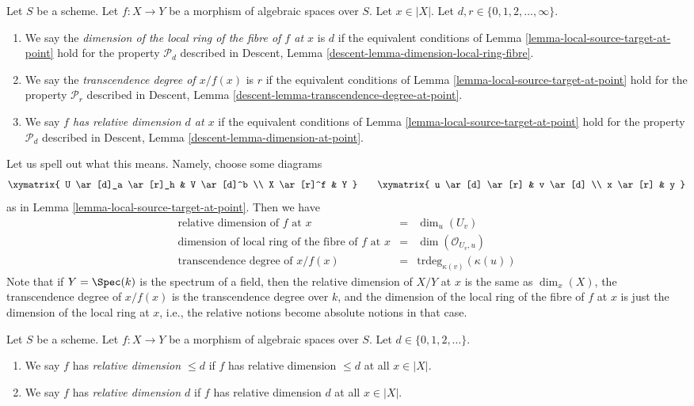 \begin{definition}
\label{definition-dimension-fibre}
Let $S$ be a scheme.
Let $f : X \to Y$ be a morphism of algebraic spaces over $S$.
Let $x \in |X|$.
Let $d, r \in \{0, 1, 2, \ldots, \infty\}$.
\begin{enumerate}
\item We say the
{\it dimension of the local ring of the fibre of $f$ at $x$} is $d$
if the equivalent conditions of
Lemma \ref{lemma-local-source-target-at-point}
hold for the property
$\mathcal{P}_d$ described in
Descent, Lemma \ref{descent-lemma-dimension-local-ring-fibre}.
\item We say the
{\it transcendence degree of $x/f(x)$} is $r$
if the equivalent conditions of
Lemma \ref{lemma-local-source-target-at-point}
hold for the property
$\mathcal{P}_r$ described in
Descent, Lemma \ref{descent-lemma-transcendence-degree-at-point}.
\item We say
{\it $f$ has relative dimension $d$ at $x$}
if the equivalent conditions of
Lemma \ref{lemma-local-source-target-at-point}
hold for the property
$\mathcal{P}_d$ described in
Descent, Lemma \ref{descent-lemma-dimension-at-point}.
\end{enumerate}
\end{definition}

\noindent
Let us spell out what this means. Namely, choose some
diagrams
$$
\xymatrix{
U \ar[d]_a \ar[r]_h & V \ar[d]^b \\
X \ar[r]^f & Y
}
\quad\quad
\xymatrix{
u \ar[d] \ar[r] & v \ar[d] \\
x \ar[r] & y
}
$$
as in
Lemma \ref{lemma-local-source-target-at-point}.
Then we have
$$
\begin{matrix}
\text{relative dimension of }f\text{ at }x & = &
\dim_u (U_v) \\
\text{dimension of local ring of the fibre of }f\text{ at }x & = &
\dim(\mathcal{O}_{U_v, u})\\
\text{transcendence degree of }x/f(x) & = &
\text{trdeg}_{\kappa(v)}(\kappa(u))
\end{matrix}
$$
Note that if $Y = \Spec(k)$ is the spectrum of a field, then
the relative dimension of $X/Y$ at $x$ is the same as $\dim_x(X)$,
the transcendence degree of $x/f(x)$ is the transcendence degree
over $k$, and the dimension of the local ring of the fibre of $f$
at $x$ is just the dimension of the local ring at $x$, i.e., the
relative notions become absolute notions in that case.

\begin{definition}
\label{definition-relative-dimension}
Let $S$ be a scheme.
Let $f : X \to Y$ be a morphism of algebraic spaces over $S$.
Let $d \in \{0, 1, 2, \ldots\}$.
\begin{enumerate}
\item We say $f$ has {\it relative dimension $\leq d$} if
$f$ has relative dimension $\leq d$ at all $x \in |X|$.
\item We say $f$ has {\it relative dimension $d$} if
$f$ has relative dimension $d$ at all $x \in |X|$.
\end{enumerate}
\end{definition}

